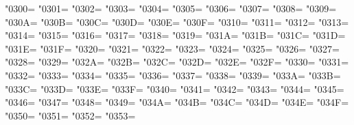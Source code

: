 \XeTeXcharclass"0300=\KclassCM
\XeTeXcharclass"0301=\KclassCM
\XeTeXcharclass"0302=\KclassCM
\XeTeXcharclass"0303=\KclassCM
\XeTeXcharclass"0304=\KclassCM
\XeTeXcharclass"0305=\KclassCM
\XeTeXcharclass"0306=\KclassCM
\XeTeXcharclass"0307=\KclassCM
\XeTeXcharclass"0308=\KclassCM
\XeTeXcharclass"0309=\KclassCM
\XeTeXcharclass"030A=\KclassCM
\XeTeXcharclass"030B=\KclassCM
\XeTeXcharclass"030C=\KclassCM
\XeTeXcharclass"030D=\KclassCM
\XeTeXcharclass"030E=\KclassCM
\XeTeXcharclass"030F=\KclassCM
\XeTeXcharclass"0310=\KclassCM
\XeTeXcharclass"0311=\KclassCM
\XeTeXcharclass"0312=\KclassCM
\XeTeXcharclass"0313=\KclassCM
\XeTeXcharclass"0314=\KclassCM
\XeTeXcharclass"0315=\KclassCM
\XeTeXcharclass"0316=\KclassCM
\XeTeXcharclass"0317=\KclassCM
\XeTeXcharclass"0318=\KclassCM
\XeTeXcharclass"0319=\KclassCM
\XeTeXcharclass"031A=\KclassCM
\XeTeXcharclass"031B=\KclassCM
\XeTeXcharclass"031C=\KclassCM
\XeTeXcharclass"031D=\KclassCM
\XeTeXcharclass"031E=\KclassCM
\XeTeXcharclass"031F=\KclassCM
\XeTeXcharclass"0320=\KclassCM
\XeTeXcharclass"0321=\KclassCM
\XeTeXcharclass"0322=\KclassCM
\XeTeXcharclass"0323=\KclassCM
\XeTeXcharclass"0324=\KclassCM
\XeTeXcharclass"0325=\KclassCM
\XeTeXcharclass"0326=\KclassCM
\XeTeXcharclass"0327=\KclassCM
\XeTeXcharclass"0328=\KclassCM
\XeTeXcharclass"0329=\KclassCM
\XeTeXcharclass"032A=\KclassCM
\XeTeXcharclass"032B=\KclassCM
\XeTeXcharclass"032C=\KclassCM
\XeTeXcharclass"032D=\KclassCM
\XeTeXcharclass"032E=\KclassCM
\XeTeXcharclass"032F=\KclassCM
\XeTeXcharclass"0330=\KclassCM
\XeTeXcharclass"0331=\KclassCM
\XeTeXcharclass"0332=\KclassCM
\XeTeXcharclass"0333=\KclassCM
\XeTeXcharclass"0334=\KclassCM
\XeTeXcharclass"0335=\KclassCM
\XeTeXcharclass"0336=\KclassCM
\XeTeXcharclass"0337=\KclassCM
\XeTeXcharclass"0338=\KclassCM
\XeTeXcharclass"0339=\KclassCM
\XeTeXcharclass"033A=\KclassCM
\XeTeXcharclass"033B=\KclassCM
\XeTeXcharclass"033C=\KclassCM
\XeTeXcharclass"033D=\KclassCM
\XeTeXcharclass"033E=\KclassCM
\XeTeXcharclass"033F=\KclassCM
\XeTeXcharclass"0340=\KclassCM
\XeTeXcharclass"0341=\KclassCM
\XeTeXcharclass"0342=\KclassCM
\XeTeXcharclass"0343=\KclassCM
\XeTeXcharclass"0344=\KclassCM
\XeTeXcharclass"0345=\KclassCM
\XeTeXcharclass"0346=\KclassCM
\XeTeXcharclass"0347=\KclassCM
\XeTeXcharclass"0348=\KclassCM
\XeTeXcharclass"0349=\KclassCM
\XeTeXcharclass"034A=\KclassCM
\XeTeXcharclass"034B=\KclassCM
\XeTeXcharclass"034C=\KclassCM
\XeTeXcharclass"034D=\KclassCM
\XeTeXcharclass"034E=\KclassCM
\XeTeXcharclass"034F=\KclassCM
\XeTeXcharclass"0350=\KclassCM
\XeTeXcharclass"0351=\KclassCM
\XeTeXcharclass"0352=\KclassCM
\XeTeXcharclass"0353=\KclassCM
